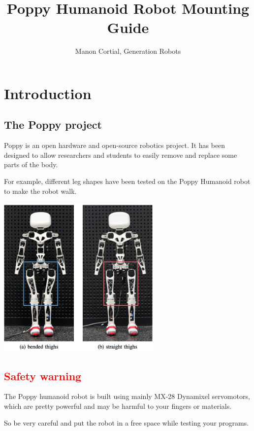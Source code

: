 \documentclass{article}
\begin{document}
\title{Poppy Humanoid Robot Mounting Guide}
\author{Manon Cortial, Generation Robots}

\maketitle

\section{Introduction}

\subsection{The Poppy project}

Poppy is an open hardware and open-source robotics project. It has been designed to allow researchers and students to easily remove and replace some parts of the body. 

For example,   different leg shapes have been tested on the Poppy Humanoid robot to make the robot walk.

 \begin{center}
  \includegraphics[width=0.6\textwidth]{img/humanoids2013_Experiments}
 \end{center}


\subsection{\textcolor{red}{Safety warning}}

The Poppy humanoid robot is built using mainly MX-28 Dynamixel servomotors, which are pretty powerful and may be harmful to your fingers or materials.

So be very careful and put the robot in a free space while testing your programs.
\end{document}
